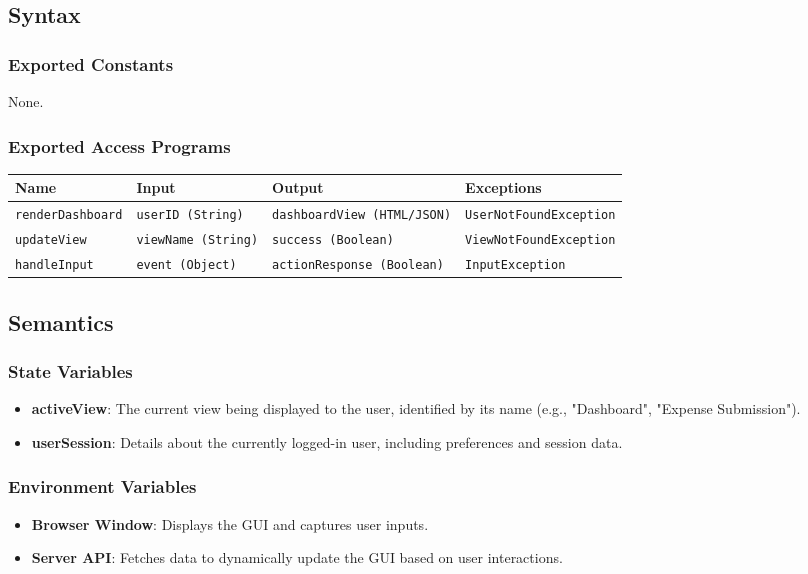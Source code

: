 \documentclass[12pt, titlepage]{article}
\begin{document}
\subsection{Syntax}

\subsubsection{Exported Constants}
None.

\subsubsection{Exported Access Programs}
\begin{center}
    \scriptsize
    \begin{tabular}{|p{3cm}|p{4cm}|p{4cm}|p{4cm}|}
        \hline
        \textbf{Name} & \textbf{Input} & \textbf{Output} & \textbf{Exceptions} \\
        \hline
        \texttt{renderDashboard} & \texttt{userID (String)} & \texttt{dashboardView (HTML/JSON)} & \texttt{UserNotFoundException} \\
        \hline
        \texttt{updateView} & \texttt{viewName (String)} & \texttt{success (Boolean)} & \texttt{ViewNotFoundException} \\
        \hline
        \texttt{handleInput} & \texttt{event (Object)} & \texttt{actionResponse (Boolean)} & \texttt{InputException} \\
        \hline
    \end{tabular}
\end{center}

\subsection{Semantics}

\subsubsection{State Variables}
\begin{itemize}
    \item \textbf{activeView}: The current view being displayed to the user, identified by its name (e.g., "Dashboard", "Expense Submission").
    \item \textbf{userSession}: Details about the currently logged-in user, including preferences and session data.
\end{itemize}

\subsubsection{Environment Variables}
\begin{itemize}
    \item \textbf{Browser Window}: Displays the GUI and captures user inputs.
    \item \textbf{Server API}: Fetches data to dynamically update the GUI based on user interactions.
\end{itemize}
\end{document}

